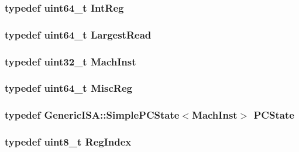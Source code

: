 \hypertarget{namespaceAlphaISA_a0e080577527fb3e9685399f75b5caf15}{
\subsubsection[{IntReg}]{\setlength{\rightskip}{0pt plus 5cm}typedef uint64\_\-t {\bf IntReg}}}
\label{namespaceAlphaISA_a0e080577527fb3e9685399f75b5caf15}
\hypertarget{namespaceAlphaISA_a13e8c318dd29afdaf79751a072344db8}{
\subsubsection[{LargestRead}]{\setlength{\rightskip}{0pt plus 5cm}typedef uint64\_\-t {\bf LargestRead}}}
\label{namespaceAlphaISA_a13e8c318dd29afdaf79751a072344db8}
\hypertarget{namespaceAlphaISA_a301c22ea09fa33dcfe6ddf22f203699c}{
\subsubsection[{MachInst}]{\setlength{\rightskip}{0pt plus 5cm}typedef {\bf uint32\_\-t} {\bf MachInst}}}
\label{namespaceAlphaISA_a301c22ea09fa33dcfe6ddf22f203699c}
\hypertarget{namespaceAlphaISA_aa16539aa6584fd12f7d6fa868f75b4de}{
\subsubsection[{MiscReg}]{\setlength{\rightskip}{0pt plus 5cm}typedef uint64\_\-t {\bf MiscReg}}}
\label{namespaceAlphaISA_aa16539aa6584fd12f7d6fa868f75b4de}
\hypertarget{namespaceAlphaISA_af780de49982ecf691215cac9b9dfc615}{
\subsubsection[{PCState}]{\setlength{\rightskip}{0pt plus 5cm}typedef {\bf GenericISA::SimplePCState}$<${\bf MachInst}$>$ {\bf PCState}}}
\label{namespaceAlphaISA_af780de49982ecf691215cac9b9dfc615}
\hypertarget{namespaceAlphaISA_a1c4e98d2e6a11a837bf9ccd20dd32f8a}{
\subsubsection[{RegIndex}]{\setlength{\rightskip}{0pt plus 5cm}typedef uint8\_\-t {\bf RegIndex}}}
\label{namespaceAlphaISA_a1c4e98d2e6a11a837bf9ccd20dd32f8a}


